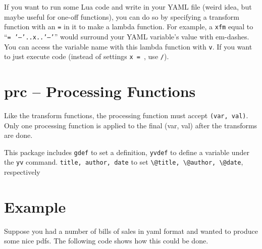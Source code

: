 \documentclass{article}
\begin{document}
If you want to run some Lua code and write in your YAML file (weird idea, but maybe useful for one-off functions),
you can do so by specifying a transform function with an \texttt{=} in it to make a lambda function.
For example, a \texttt{xfm} equal to
``\texttt{= '---'..x..'---'}''
would surround your YAML variable's value with em-dashes.
You can access the variable name with this lambda function with \texttt{v}.
If you want to just execute code (instead of settings \texttt{x = }, use \texttt{/}).

  \section{prc -- Processing Functions}
Like the transform functions, the processing function must accept \texttt{(var, val)}.
Only one processing function is applied to the final (var, val) after the transforms are done.

This package includes \texttt{gdef} to set a definition, \texttt{yvdef} to define a variable under the \texttt{yv} command.
\texttt{title, author, date} to set \texttt{\textbackslash @title, \textbackslash @author, \textbackslash @date},
respectively

    \section{Example}\label{example}

    Suppose you had a number of bills of sales in yaml format and wanted to produce some nice pdfs.
    The following code shows how this could be done.

    \pagebreak
    \vspace*{-5em}
\end{document}
